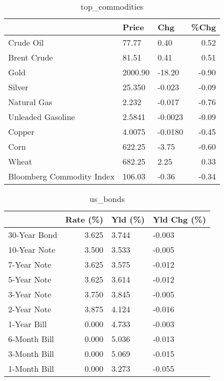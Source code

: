 \documentclass{article}%
\begin{document}
\begin{table}[htbp]%
\caption{top\_commodities}%
\centering%
\begin{adjustbox}{width=1\textwidth}%
\begin{tabular}{lllr}
\toprule
                          &   Price &     Chg &  \%Chg \\
\midrule
               Crude Oil  &   77.77 &    0.40 &  0.52 \\
             Brent Crude  &   81.51 &    0.41 &  0.51 \\
                    Gold  & 2000.90 &  -18.20 & -0.90 \\
                  Silver  &  25.350 &  -0.023 & -0.09 \\
             Natural Gas  &   2.232 &  -0.017 & -0.76 \\
       Unleaded Gasoline  &  2.5841 & -0.0023 & -0.09 \\
                  Copper  &  4.0075 & -0.0180 & -0.45 \\
                    Corn  &  622.25 &   -3.75 & -0.60 \\
                   Wheat  &  682.25 &    2.25 &  0.33 \\
Bloomberg Commodity Index &  106.03 &   -0.36 & -0.34 \\
\bottomrule
\end{tabular}
%
\end{adjustbox}%
\end{table}

%


\begin{table}[htbp]%
\caption{us\_bonds}%
\centering%
\begin{adjustbox}{width=1\textwidth}%
\begin{tabular}{lrll}
\toprule
             &  Rate (\%) & Yld (\%) & Yld Chg (\%) \\
\midrule
30-Year Bond &     3.625 &   3.744 &      -0.003 \\
10-Year Note &     3.500 &   3.533 &      -0.005 \\
 7-Year Note &     3.625 &   3.575 &      -0.012 \\
 5-Year Note &     3.625 &   3.614 &      -0.012 \\
 3-Year Note &     3.750 &   3.845 &      -0.005 \\
 2-Year Note &     3.875 &   4.124 &      -0.016 \\
 1-Year Bill &     0.000 &   4.733 &      -0.003 \\
6-Month Bill &     0.000 &   5.036 &      -0.013 \\
3-Month Bill &     0.000 &   5.069 &      -0.015 \\
1-Month Bill &     0.000 &   3.273 &      -0.055 \\
\bottomrule
\end{tabular}
%
\end{adjustbox}%
\end{table}
\end{document}
